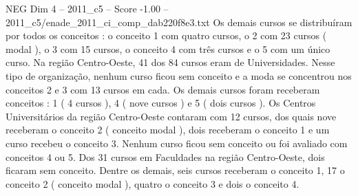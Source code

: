 \begin{textsample}{NEG Dim 4 – 2011\_c5 – Score -1.00 – 2011\_c5/enade\_2011\_ci\_comp\_dab220f8e3.txt}
Os demais cursos se distribuíram por todos os conceitos : o conceito 1 com quatro cursos, o 2 com 23 cursos ( modal ), o 3 com 15 cursos, o conceito 4 com três cursos e o 5 com um único curso.
Na região Centro-Oeste, 41 dos 84 cursos eram de Universidades.
Nesse tipo de organização, nenhum curso ficou sem conceito e a moda se concentrou nos conceitos 2 e 3 com 13 cursos em cada.
Os demais cursos foram receberam conceitos : 1 ( 4 cursos ), 4 ( nove cursos ) e 5 ( dois cursos ).
Os Centros Universitários da região Centro-Oeste contaram com 12 cursos, dos quais nove receberam o conceito 2 ( conceito modal ), dois receberam o conceito 1 e um curso recebeu o conceito 3.
Nenhum curso ficou sem conceito ou foi avaliado com conceitos 4 ou 5.
Dos 31 cursos em Faculdades na região Centro-Oeste, dois ficaram sem conceito.
Dentre os demais, seis cursos receberam o conceito 1, 17 o conceito 2 ( conceito modal ), quatro o conceito 3 e dois o conceito 4.

\end{textsample}
